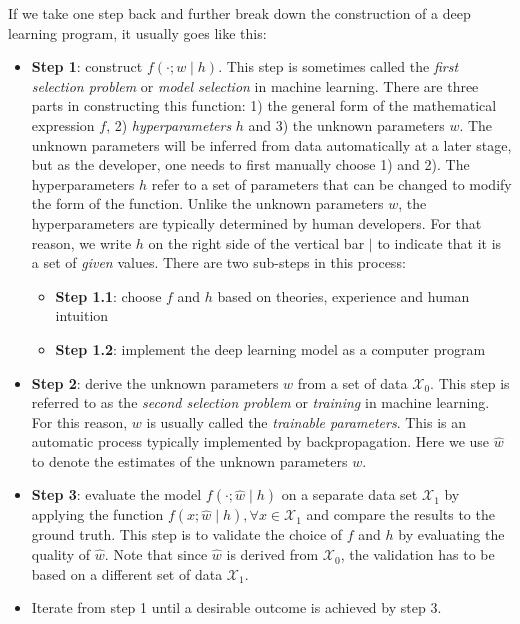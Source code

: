 If we take one step back and further break down the construction of a deep learning program, it usually goes like this:
\begin{itemize}
\item {\bf Step 1}: construct $f(\cdot; w\mid h)$. This step is sometimes called the \emph{first selection problem} or \emph{model selection} in machine learning. There are three parts in constructing this function: 1) the general form of the mathematical expression $f$, 2) \emph{hyperparameters} $h$ and 3) the unknown parameters $w$. The unknown parameters will be inferred from data automatically at a later stage, but as the developer, one needs to first manually choose 1) and 2). The hyperparameters $h$ refer to a set of parameters that can be changed to modify the form of the function.
  Unlike the unknown parameters $w$, the hyperparameters are typically determined by human developers. For that reason, we write $h$ on the right side of the vertical bar $\mid$ to indicate that it is a set of \emph{given} values.
  There are two sub-steps in this process:
  \begin{itemize}
  \item {\bf Step 1.1}: choose $f$ and $h$ based on theories, experience and human intuition
  \item {\bf Step 1.2}: implement the deep learning model as a computer program
  \end{itemize}
\item {\bf Step 2}: derive the unknown parameters $w$ from a set of data $\mathcal{X}_0$. This step is referred to as the \emph{second selection problem} or \emph{training} in machine learning. For this reason, $w$ is usually called the \emph{trainable parameters}. This is an automatic process typically implemented by backpropagation. Here we use $\hat{w}$ to denote the estimates of the unknown parameters $w$.
\item {\bf Step 3}: evaluate the model $f(\cdot; \hat{w}\mid h)$ on a separate data set $\mathcal{X}_1$ by applying the function $f(x; \hat{w}\mid h), \forall x\in\mathcal{X}_1$ and compare the results to the ground truth. This step is to validate the choice of $f$ and $h$ by evaluating the quality of $\hat{w}$. Note that since $\hat{w}$ is derived from $\mathcal{X}_0$, the validation has to be based on a different set of data $\mathcal{X}_1$.
\item Iterate from step 1 until a desirable outcome is achieved by step 3.
\end{itemize}

